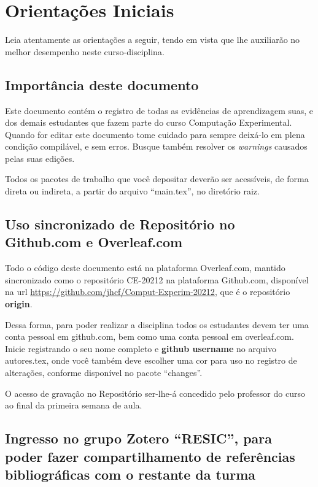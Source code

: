 \chapter{Orientações Iniciais}

Leia atentamente as orientações a seguir, tendo em vista que lhe auxiliarão no melhor desempenho neste curso-disciplina. 

\section{Importância deste documento}

Este documento contém o registro de todas as evidências de aprendizagem suas, e dos demais estudantes que fazem parte do curso Computação Experimental.
Quando for editar este documento tome cuidado para sempre deixá-lo em plena condição compilável, e sem erros. Busque também resolver os \textit{warnings} causados pelas suas edições.

Todos os pacotes de trabalho que você depositar deverão ser acessíveis, de forma direta ou indireta, a partir do arquivo ``main.tex'', no diretório raiz.

\section{Uso sincronizado de Repositório no Github.com e Overleaf.com}

Todo o código deste documento está na plataforma Overleaf.com, mantido sincronizado como o repositório CE-20212 na plataforma Github.com, disponível na url \url{https://github.com/jhcf/Comput-Experim-20212}, que é o repositório \textbf{origin}.

Dessa forma, para poder realizar a disciplina todos os estudantes devem ter uma conta pessoal em github.com, bem como uma conta pessoal em overleaf.com. Inicie registrando o seu nome completo e \textbf{github username} no arquivo autores.tex, onde você também deve escolher uma cor para uso no registro de alterações, conforme disponível no pacote ``changes''.

O acesso de gravação no Repositório ser-lhe-á concedido pelo professor do curso ao final da primeira semana de aula.

\section{Ingresso no grupo Zotero ``RESIC'', para poder fazer  compartilhamento de referências bibliográficas com o restante da turma}

